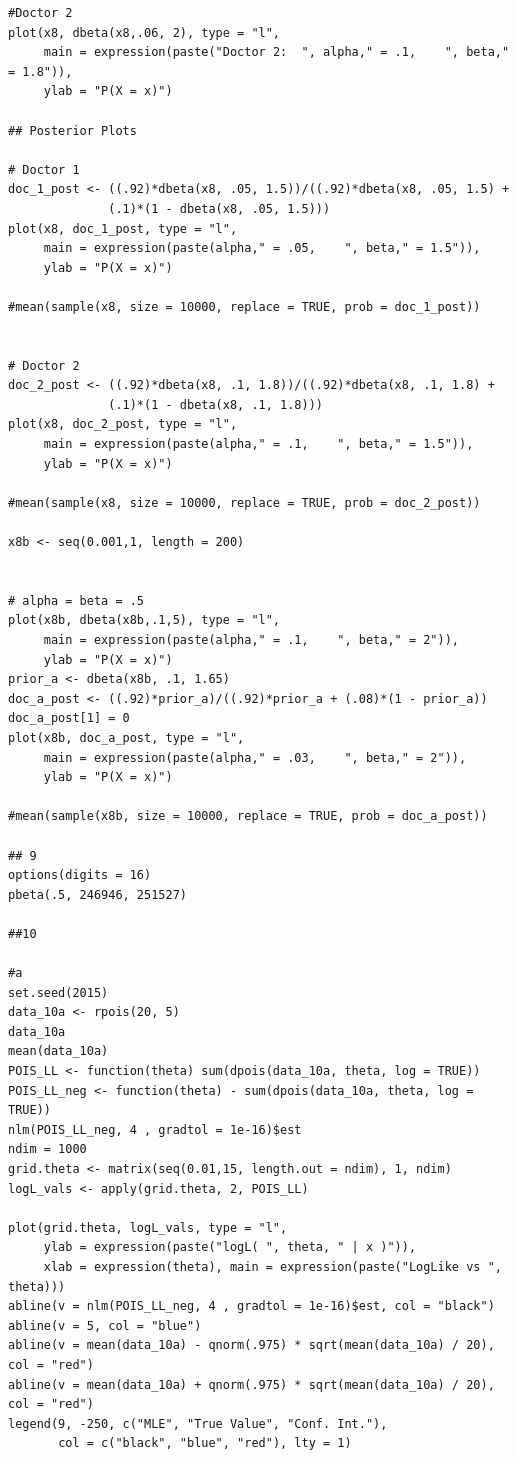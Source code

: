 \documentclass[12pt]{article}\usepackage[]{graphicx}\usepackage[]{color}
\begin{document}
\begin{verbatim}
#Doctor 2
plot(x8, dbeta(x8,.06, 2), type = "l", 
     main = expression(paste("Doctor 2:  ", alpha," = .1,    ", beta," = 1.8")),
     ylab = "P(X = x)") 

## Posterior Plots

# Doctor 1
doc_1_post <- ((.92)*dbeta(x8, .05, 1.5))/((.92)*dbeta(x8, .05, 1.5) + 
              (.1)*(1 - dbeta(x8, .05, 1.5)))
plot(x8, doc_1_post, type = "l", 
     main = expression(paste(alpha," = .05,    ", beta," = 1.5")),
     ylab = "P(X = x)")

#mean(sample(x8, size = 10000, replace = TRUE, prob = doc_1_post))


# Doctor 2
doc_2_post <- ((.92)*dbeta(x8, .1, 1.8))/((.92)*dbeta(x8, .1, 1.8) + 
              (.1)*(1 - dbeta(x8, .1, 1.8)))
plot(x8, doc_2_post, type = "l", 
     main = expression(paste(alpha," = .1,    ", beta," = 1.5")),
     ylab = "P(X = x)")

#mean(sample(x8, size = 10000, replace = TRUE, prob = doc_2_post))

x8b <- seq(0.001,1, length = 200)


# alpha = beta = .5
plot(x8b, dbeta(x8b,.1,5), type = "l", 
     main = expression(paste(alpha," = .1,    ", beta," = 2")),
     ylab = "P(X = x)") 
prior_a <- dbeta(x8b, .1, 1.65)
doc_a_post <- ((.92)*prior_a)/((.92)*prior_a + (.08)*(1 - prior_a))
doc_a_post[1] = 0
plot(x8b, doc_a_post, type = "l", 
     main = expression(paste(alpha," = .03,    ", beta," = 2")),
     ylab = "P(X = x)")

#mean(sample(x8b, size = 10000, replace = TRUE, prob = doc_a_post))

## 9 
options(digits = 16)
pbeta(.5, 246946, 251527)

##10

#a
set.seed(2015)
data_10a <- rpois(20, 5)
data_10a
mean(data_10a)
POIS_LL <- function(theta) sum(dpois(data_10a, theta, log = TRUE))
POIS_LL_neg <- function(theta) - sum(dpois(data_10a, theta, log = TRUE))
nlm(POIS_LL_neg, 4 , gradtol = 1e-16)$est
ndim = 1000
grid.theta <- matrix(seq(0.01,15, length.out = ndim), 1, ndim)
logL_vals <- apply(grid.theta, 2, POIS_LL)

plot(grid.theta, logL_vals, type = "l", 
     ylab = expression(paste("logL( ", theta, " | x )")),
     xlab = expression(theta), main = expression(paste("LogLike vs ", theta)))
abline(v = nlm(POIS_LL_neg, 4 , gradtol = 1e-16)$est, col = "black")
abline(v = 5, col = "blue")
abline(v = mean(data_10a) - qnorm(.975) * sqrt(mean(data_10a) / 20), col = "red")
abline(v = mean(data_10a) + qnorm(.975) * sqrt(mean(data_10a) / 20), col = "red")
legend(9, -250, c("MLE", "True Value", "Conf. Int."), 
       col = c("black", "blue", "red"), lty = 1)


\end{verbatim}
\end{document}
